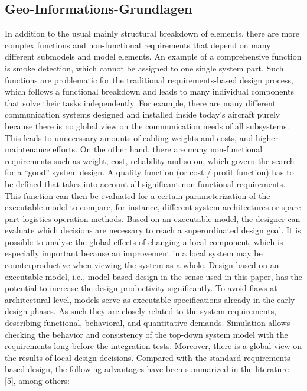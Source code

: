 \subsection*{Geo-Informations-Grundlagen}

In addition to the usual mainly structural breakdown of
elements, there are more complex functions and non-functional
requirements that depend on many different submodels and
model elements. An example of a comprehensive function
is smoke detection, which cannot be assigned to one single
system part. Such functions are problematic for the traditional
requirements-based design process, which follows a functional
breakdown and leads to many individual components that
solve their tasks independently. For example, there are many
different communication systems designed and installed inside
today’s aircraft purely because there is no global view on
the communication needs of all subsystems. This leads to
unnecessary amounts of cabling weights and costs, and higher
maintenance efforts.
On the other hand, there are many non-functional requirements such as weight, cost, reliability and so on, which
govern the search for a “good” system design. A quality
function (or cost / profit function) has to be defined that takes
into account all significant non-functional requirements. This
function can then be evaluated for a certain parameterization of
the executable model to compare, for instance, different system
architectures or spare part logistics operation methods.
Based on an executable model, the designer can evaluate
which decisions are necessary to reach a superordinated design
goal. It is possible to analyse the global effects of changing
a local component, which is especially important because an
improvement in a local system may be counterproductive when
viewing the system as a whole.
Design based on an executable model, i.e., model-based
design in the sense used in this paper, has the potential to
increase the design productivity significantly. To avoid flaws
at architectural level, models serve as executable specifications already in the early design phases. As such they are
closely related to the system requirements, describing functional, behavioral, and quantitative demands. Simulation allows
checking the behavior and consistency of the top-down system
model with the requirements long before the integration tests.
Moreover, there is a global view on the results of local design
decisions.
Compared with the standard requirements-based design, the
following advantages have been summarized in the literature [5], among others:
